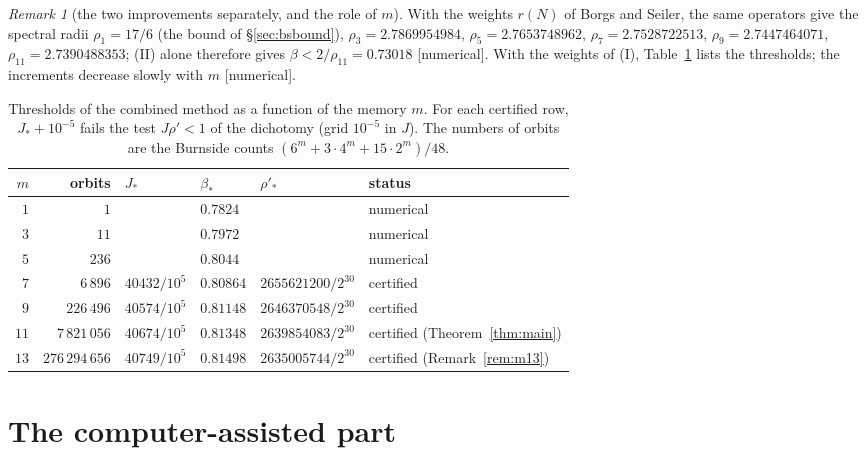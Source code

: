 \documentclass[11pt,a4paper]{article}
\theoremstyle{plain}
\theoremstyle{remark}
\newtheorem{remark}[theorem]{Remark}
\numberwithin{equation}{section}
\newcommand{\st}[1]{\textsf{[#1]}}
\begin{document}
\begin{remark}[the two improvements separately, and the role of $m$]\label{rem:contrib}
With the weights $r(N)$ of Borgs and Seiler, the same operators give the spectral radii $\rho_1=17/6$ (the bound of
\S\ref{sec:bsbound}), $\rho_3=2.7869954984$, $\rho_5=2.7653748962$, $\rho_7=2.7528722513$, $\rho_9=2.7447464071$,
$\rho_{11}=2.7390488353$; (II) alone therefore gives $\beta<2/\rho_{11}=0.73018$ \st{numerical}. With the weights of (I),
Table~\ref{tab:memory} lists the thresholds; the increments decrease slowly with $m$ \st{numerical}.
\end{remark}

\begin{table}[ht]
\centering\small
\begin{tabular}{@{}rrllll@{}}
\toprule
$m$ & orbits & $J_*$ & $\beta_*$ & $\rho'_*$ & status\\
\midrule
$1$ & $1$ & & $0.7824$ & & numerical\\
$3$ & $11$ & & $0.7972$ & & numerical\\
$5$ & $236$ & & $0.8044$ & & numerical\\
$7$ & $6\,896$ & $40432/10^5$ & $0.80864$ & $2655621200/2^{30}$ & certified\\
$9$ & $226\,496$ & $40574/10^5$ & $0.81148$ & $2646370548/2^{30}$ & certified\\
$11$ & $7\,821\,056$ & $40674/10^5$ & $0.81348$ & $2639854083/2^{30}$ & certified (Theorem~\ref{thm:main})\\
$13$ & $276\,294\,656$ & $40749/10^5$ & $0.81498$ & $2635005744/2^{30}$ & certified (Remark~\ref{rem:m13})\\
\bottomrule
\end{tabular}
\caption{Thresholds of the combined method as a function of the memory $m$. For each certified row, $J_*+10^{-5}$ fails the test
$J\rho'<1$ of the dichotomy (grid $10^{-5}$ in $J$). The numbers of orbits are the Burnside counts $(6^m+3\cdot4^m+15\cdot2^m)/48$.}
\label{tab:memory}
\end{table}

\section{The computer-assisted part}\label{sec:cap}
\end{document}
